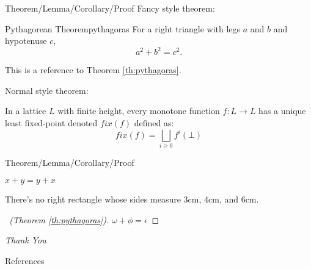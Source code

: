 \begin{frame}{Theorem/Lemma/Corollary/Proof}
    Fancy style theorem:
	\begin{theo}{Pythagorean Theorem}{pythagoras}
		For a right triangle with legs $a$ and $b$ and hypotenuse $c$,
		\[
		a^2 + b^2 = c^2. 
		\]
	\end{theo}
	This is a reference to Theorem \ref{th:pythagoras}.
    
    Normal style theorem:
    \begin{theorem}
        In a lattice $L$ with finite height, every monotone function $f : L \rightarrow L$
        has a unique least fixed-point denoted $fix (f)$ defined as:
        \[
        fix (f) = \bigsqcup_{i \geq 0}f^i(\bot)
        \]
    \end{theorem}
\end{frame}

\begin{frame}{Theorem/Lemma/Corollary/Proof}
    \begin{lemma}
        $ x + y = y + x  $
    \end{lemma}
    
    \begin{corollary}
        There's no right rectangle whose sides measure 3cm, 4cm, and 6cm.
    \end{corollary}
    
    \begin{proof}[\proofname\ (Theorem \ref{th:pythagoras})]
        $\omega +\phi = \epsilon $
    \end{proof}
\end{frame}

\begin{frame}[plain]{}
    \centering \Huge
    \emph{Thank You}
\end{frame}

\begin{frame}{References}
	\printbibliography
\end{frame}



